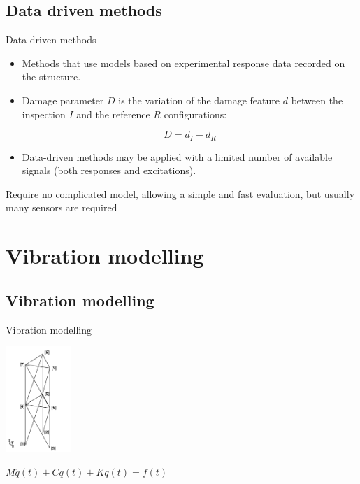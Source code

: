 \documentclass{beamer}
\begin{document}
\subsection{Data driven methods}
\begin{frame}{Data driven methods}
\begin{center}
\begin{itemize}
\item Methods that use models based on experimental response data recorded on the structure.

\vspace{1\baselineskip}
\item Damage parameter $D$ is the variation of the damage feature $d$ between
the inspection $I$ and the reference $R$ configurations:

\begin{equation}
D=d_{I} - d_{R}
\end{equation}
\item Data-driven methods may be applied with a limited number of available signals (both
responses and excitations).
\end{itemize}
\end{center}

\begin{block}{}
Require no complicated model, allowing a simple and fast evaluation, but usually many sensors are required
\end{block}

\end{frame}





\section{Vibration modelling}

\subsection{Vibration modelling}
\begin{frame}{Vibration modelling}

\begin{center}
\includegraphics[height=4cm]{images/finite_element.png}

$M \ddot{q}(t) + C \dot{q}(t) + K q(t) = f(t)$
\end{center}

\end{frame}
\end{document}
